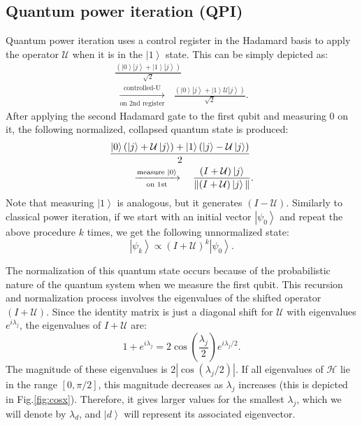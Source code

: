 \documentclass[onecolumn,10pt]{article}
\newcommand{\ket}[1]{\ensuremath{\left|#1\right\rangle}} %
\theoremstyle{remark}
\theoremstyle{plain}
\begin{document}
\subsection{Quantum power iteration (QPI)}
\label{sec:qpi}
Quantum power iteration uses a control register in the Hadamard basis to apply the operator $\mathcal{U}$ when it is in the \ket{1} state. This can be simply depicted as:
\begin{align}
\frac{\left(\ket{0}\ket{j}+\ket{1}\ket{j}\right)}{\sqrt{2}} \ \\ \ \xrightarrow[\text{on 2nd register}]{\text{controlled-U}} \ \ \  \frac{\left(\ket{0}\ket{j}+\ket{1}\mathcal{U} \ket{j}\right)}{\sqrt{2}}.
\end{align}
After applying the second Hadamard gate to the first qubit and measuring 0 on it, the following normalized, collapsed quantum state is produced:
\begin{align}
  \frac{\ket{0}\left(\ket{j}+\mathcal{U} \ket{j}\right) + \ket{1}\left(\ket{j}-\mathcal{U} \ket{j}\right)}{2} \ \\ \ \xrightarrow[\text{on 1st}]{\text{measure \ket{0}}} \ \ \ \frac{(I + \mathcal{U}) \ket{j}}{\|(I + \mathcal{U})\ket{j}\|}.
\end{align}
Note that measuring \ket{1} is analogous, but it generates $(I-\mathcal{U})$.  
Similarly to classical power iteration, if we start with an initial vector \ket{\psi_0} and repeat the above procedure $k$ times, we get the following unnormalized state:
\begin{equation}
\label{eq:qpi}
    \ket{\psi_k} \propto (I + \mathcal{U})^k \ket{\psi_0}.
\end{equation}

The normalization of this quantum state occurs because of the probabilistic nature of the quantum system when we measure the first qubit. This recursion and normalization process involves the eigenvalues of the shifted operator $(I+\mathcal{U})$. Since the identity matrix is just a diagonal shift for $\mathcal{U}$ with eigenvalues $e^{i\lambda_j}$, the eigenvalues of $I + \mathcal{U}$ are:
\begin{equation}
1 + e^{i\lambda_j} = 2\cos\left(\frac{\lambda_j}{2}\right)e^{i\lambda_j/2}.
\end{equation}
The magnitude of these eigenvalues is $2|\cos(\lambda_j/2)|$. If all eigenvalues of $\mathcal{H}$ lie in the range $[0, \pi/2]$, this magnitude decreases as $\lambda_j$ increases (this is depicted in Fig.\ref{fig:cosx}). Therefore, it gives larger values for the smallest $\lambda_j$, which we will denote by $\lambda_d$, and $\ket{d}$ will represent its associated eigenvector.
\end{document}
